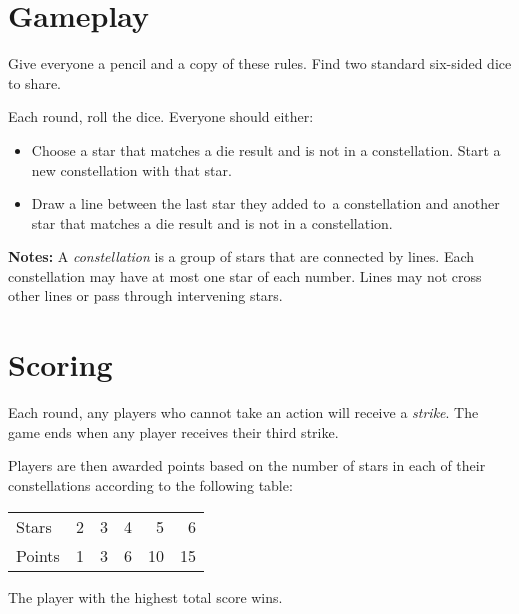 \section*{Gameplay}
%

Give everyone a pencil and a copy of these rules. Find two standard six-sided dice to share.

Each round, roll the dice. Everyone should either:
\begin{itemize}[leftmargin=*]
	\item Choose a star that matches a die result and is not in a constellation. Start a new constellation with that star.	
	\item Draw a line between the last star they added to~a constellation and another star that matches a die result and is not in a constellation.
\end{itemize}


\vfill

\textbf{Notes:} A \emph{constellation} is a group of stars that are connected by lines. Each constellation may have at most one star of each number. Lines may not cross other lines or pass through intervening stars.\vfill\null\columnbreak

\section*{Scoring}
Each round, any players who cannot take an action will receive a \emph{strike}. The game ends when any player receives their third strike.

Players are then awarded points based on the number of stars in each of their constellations according to the following table:

\begin{center}
\begin{tabular}{l rrrrr} \toprule[0.5pt]
Stars & 2 & 3 & 4 & 5 & 6 \\
Points & \phantom{1}1 & \phantom{1}3 &\phantom{1}6 & 10 & 15 \\ \bottomrule[0.5pt]
\end{tabular}
\end{center}

The player with the highest total score wins.

